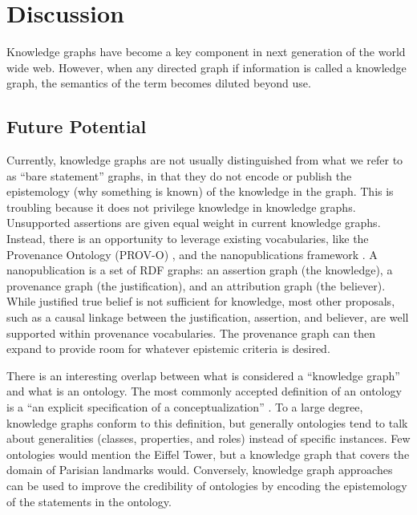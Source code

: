 \section{Discussion}

Knowledge graphs have become a key component in next generation of the world wide web.
However, when any directed graph if information is called a knowledge graph, the semantics of the term becomes diluted beyond use.


\subsection{Future Potential}

Currently, knowledge graphs are not usually distinguished from what we refer to as ``bare statement'' graphs, in that they do not encode or publish the epistemology (why something is known) of the knowledge in the graph.
This is troubling because it does not privilege knowledge in knowledge graphs.
Unsupported assertions are given equal weight in current knowledge graphs.
Instead, there is an opportunity to leverage existing vocabularies, like the Provenance Ontology (PROV-O) \cite{Moreau_2015}, and the nanopublications framework \cite{groth2010anatomy}.
A nanopublication is a set of RDF graphs: an assertion graph (the knowledge), a provenance graph (the justification), and an attribution graph (the believer).
While justified true belief is not sufficient for knowledge, most other proposals, such as a causal linkage between the justification, assertion, and believer, are well supported within provenance vocabularies.
The provenance graph can then expand to provide room for whatever epistemic criteria is desired.

There is an interesting overlap between what is considered a ``knowledge graph'' and what is an ontology.
The most commonly accepted definition of an ontology is a ``an explicit specification of a conceptualization'' \cite{Gruber_1993}.
To a large degree, knowledge graphs conform to this definition, but generally ontologies tend to talk about generalities (classes, properties, and roles) instead of specific instances.
Few ontologies would mention the Eiffel Tower, but a knowledge graph that covers the domain of Parisian landmarks would.
Conversely, knowledge graph approaches can be used to improve the credibility of ontologies by encoding the epistemology of the statements in the ontology.
